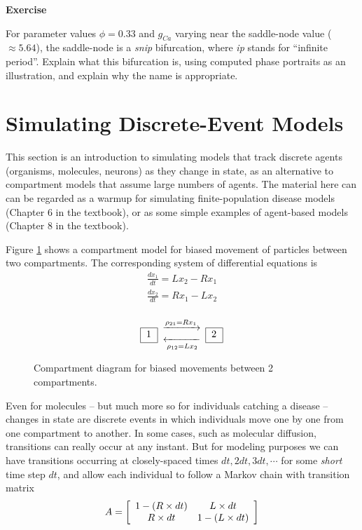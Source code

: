 \documentclass [11pt]{article}
\newcounter{exercise}
\numberwithin{exercise}{section}
\newcommand{\exnumber}{\addtocounter{exercise}{1} \theexercise \thinspace}
\begin{document}
{\bf Exercise \exnumber} For parameter values $\phi = 0.33$ and $g_{Ca}$ varying near the saddle-node
value ($\approx 5.64$), the saddle-node is a \emph{snip} bifurcation, where \emph{ip} stands for ``infinite
period''. Explain what this bifurcation is, using computed 
phase portraits as an illustration, and explain why the name is appropriate.

\section{Simulating Discrete-Event Models} 
This section is an introduction to simulating models that track discrete
agents (organisms, molecules, neurons) as they change in state, as an
alternative to compartment models that assume large numbers of agents. The material here can 
can be regarded as a warmup for simulating finite-population disease models
(Chapter 6 in the textbook), or as some simple examples of agent-based models 
(Chapter 8 in the textbook).  

Figure \ref{Cdiagram} shows a compartment model for biased movement of particles
between two compartments. The corresponding system of differential equations is 
\begin{equation}
\begin{array}{l}
\frac{dx_1}{dt} = Lx_2 - Rx_1 \\ 
\frac{dx_2}{dt} = Rx_1 - Lx_2 \\ 
\end{array}
\end{equation}

\begin{figure}[ht]
\LARGE
\[
\boxed{\;1^{ }_{ }\;}\begin{array}{*{20}c}
   {\xrightarrow{{\rho _{21}  = Rx_1 }}}  \\
   {\xleftarrow[{\rho _{12}  = Lx_2 }]{}}  \\
 \end{array} \boxed{\;2^{}_{}\;}
\]
\normalsize
\caption{Compartment diagram for biased movements between 2 compartments.}
\label{Cdiagram}
\end{figure}

Even for molecules -- but much more so for individuals catching a disease --  
changes in state are discrete events in which individuals move one by one  
from one compartment to another. In some cases, such as molecular diffusion, 
transitions can really occur at any instant. But for modeling purposes we can have  
transitions occurring at closely-spaced times $dt, 2dt, 3dt, \cdots$ for 
some \textit{short} time step $dt$, and allow each individual to follow a 
Markov chain with transition matrix 
\begin{equation*}
A = \left[ {\begin{array}{*{20}c}
   {1 - (R \times dt)} & {L \times dt}  \\
   {R \times dt} & {1 - (L\times dt)}  \\
 \end{array} } \right]
\end{equation*}
\end{document}
